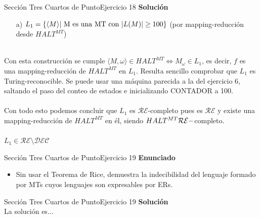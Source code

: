\documentclass[10pt, envcountsect, presentation, aspectratio=169]{beamer}
\begin{document}

\begin{frame}{Sección Tres Cuartos de Punto}{Ejercicio 18}
    \textbf{Solución}\\
    \begin{itemize}
        \item[a)] $L_1 = \{\langle M \rangle \hbox{| M es una MT con } |L(M)| \geq 100\}$ (por mapping-reducción desde $HALT^{MT}$) \\~\\
    \end{itemize}
    Con esta construcción se cumple $\langle M, \omega \rangle \in HALT^{MT} \Leftrightarrow M_{\omega} \in L_1$, es decir, $f$ es una mapping-reducción de $HALT^{MT}$ en $L_1$. Resulta sencillo comprobar que $L_1$ es Turing-reconocible.
    Se puede usar una máquina parecida a la del ejercicio 6, saltando el paso del conteo de estados e inicializando CONTADOR a 100.\\~\\
    Con todo esto podemos concluir que $L_1$ es $\mathcal{RE}$-completo pues es $\mathcal{RE}$ y existe una mapping-reducción de $HALT^{MT}$ en él, siendo $HALT^{MT} \space \mathcal{RE}-$completo.\\~\\
    $L_1 \in \mathcal{RE} \setminus \mathcal{DEC}$ 
\end{frame}


\begin{frame}{Sección Tres Cuartos de Punto}{Ejercicio 19}
    \textbf{Enunciado}
    \begin{itemize}
        \item Sin usar el Teorema de Rice, demuestra la indecibilidad del lenguaje formado por MTs cuyos lenguajes son expresables por ERs.
    \end{itemize}
\end{frame}


\begin{frame}{Sección Tres Cuartos de Punto}{Ejercicio 19}
    \textbf{Solución}\\
    La solución es...
\end{frame}

\end{document}
